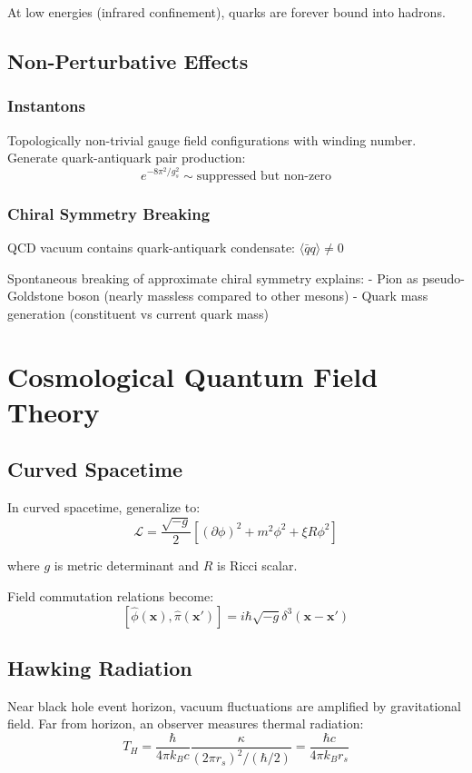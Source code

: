 \documentclass[12pt,openany,oneside]{book}
\begin{document}
{{{At low energies (infrared confinement), quarks are forever bound into hadrons.

\section{Non-Perturbative Effects}

\subsection{Instantons}

Topologically non-trivial gauge field configurations with winding number. Generate quark-antiquark pair production:
\[
e^{-8\pi^2/g_s^2} \sim \text{suppressed but non-zero}
\]

\subsection{Chiral Symmetry Breaking}

QCD vacuum contains quark-antiquark condensate: $\langle\bar{q}q\rangle \ne 0$

Spontaneous breaking of approximate chiral symmetry explains:
- Pion as pseudo-Goldstone boson (nearly massless compared to other mesons)
- Quark mass generation (constituent vs current quark mass)

\chapter{Cosmological Quantum Field Theory}

\section{Curved Spacetime}

In curved spacetime, generalize to:
\[
\mathcal{L} = \frac{\sqrt{-g}}{2}[(\partial\phi)^2 + m^2\phi^2 + \xi R\phi^2]
\]

where $g$ is metric determinant and $R$ is Ricci scalar.

Field commutation relations become:
\[
[\hat{\phi}(\mathbf{x}), \hat{\pi}(\mathbf{x}')] = i\hbar\sqrt{-g}\delta^3(\mathbf{x} - \mathbf{x}')
\]

\section{Hawking Radiation}

Near black hole event horizon, vacuum fluctuations are amplified by gravitational field. Far from horizon, an observer measures thermal radiation:
\[
T_H = \frac{\hbar}{4\pi k_B c}\frac{\kappa}{(2\pi r_s)^2/(\hbar/2)} = \frac{\hbar c}{4\pi k_B r_s}
\]

}}}
\end{document}
